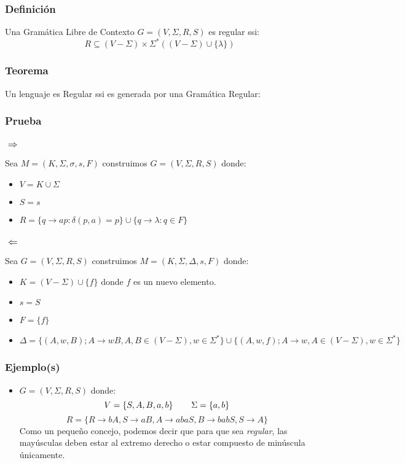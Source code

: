 \subsubsection{Definición}
Una Gramática Libre de Contexto $G=(V,\Sigma,R,S)$ es regular ssi:
$$
R \subseteq (V-\Sigma)\times \Sigma^*((V-\Sigma)\cup \{ \lambda \} )
$$
\subsubsection{Teorema}
Un lenguaje es Regular ssi es generada por una Gramática Regular:
\subsubsection*{Prueba}
\subsubsection*{ $\Rightarrow$}
Sea $M=(K,\Sigma,\sigma,s,F)$ construimos $G=(V,\Sigma , R,S)$ donde:
\begin{itemize}
\item $V= K \cup \Sigma$
\item $S = s$
\item $R = \{ q \rightarrow ap : \delta(p,a)=p \} \cup \{ q \rightarrow \lambda : q\in F \}$
\end{itemize}
\subsubsection*{$\Leftarrow$}
Sea $G = (V,\Sigma,R,S)$ construimos $M=(K,\Sigma,\Delta,s,F)$ donde:
\begin{itemize}
\item $K = (V-\Sigma) \cup \{f\}$ donde $f$ es un nuevo elemento.
\item $s=S$
\item $F=\{f\}$
\item $\Delta = \big\{ (A,w,B);A\rightarrow wB, A,B \in (V-\Sigma) ,w \in \Sigma^* \big\} \cup \big\{ (A,w,f);A\rightarrow w, A \in (V-\Sigma) ,w \in \Sigma^* \big\}$
\end{itemize}
\subsubsection{Ejemplo(s)}
\begin{itemize}
\item $G =(V,\Sigma,R,S)$ donde:
$$
	V = \{ S, A, B, a ,b \} \hspace{0.75cm} \Sigma = \{ a ,b \} 
$$
$$
	R =\{ R\rightarrow bA,S\rightarrow aB,A\rightarrow abaS,B\rightarrow babS, S\rightarrow A \}
$$
Como un pequeño concejo, podemos decir que para que sea \textit{regular}, las mayúsculas deben estar al extremo derecho o estar compuesto de minúscula únicamente.
\end{itemize}
